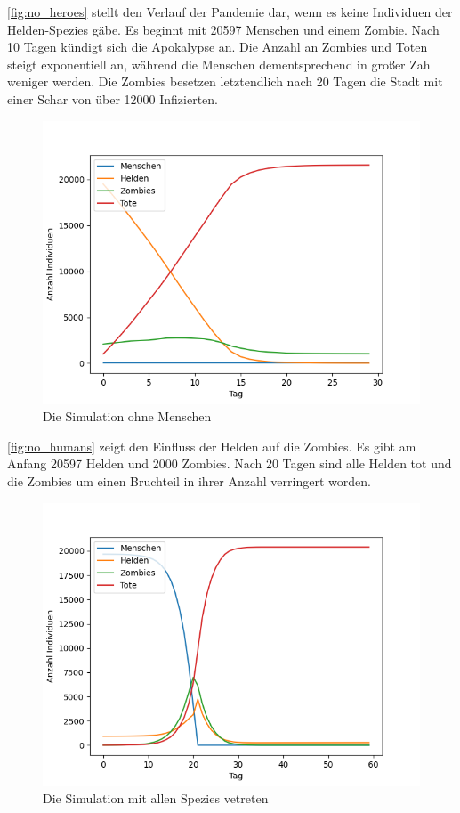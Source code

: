     \autoref{fig:no_heroes} stellt den Verlauf der Pandemie dar, wenn es keine Individuen der Helden-Spezies gäbe. Es beginnt mit 20597 Menschen und einem Zombie. Nach 10 Tagen kündigt sich die Apokalypse an. Die Anzahl an Zombies und Toten steigt exponentiell an, während die Menschen dementsprechend in großer Zahl weniger werden. Die Zombies besetzen letztendlich nach 20 Tagen die Stadt mit einer Schar von über 12000 Infizierten.
    \newpage
    \begin{figure}[h]
        \centering
        \includegraphics[width=1\textwidth]{zombified_all_heroes.png}
        \caption{Die Simulation ohne Menschen}
        \label{fig:no_humans}
    \end{figure}
    \autoref{fig:no_humans} zeigt den Einfluss der Helden auf die Zombies. Es gibt am Anfang 20597 Helden und 2000 Zombies. Nach 20 Tagen sind alle Helden tot und die Zombies um einen Bruchteil in ihrer Anzahl verringert worden.
    \newpage
    \begin{figure}[h]
        \centering
        \includegraphics[width=1\textwidth]{zombified.png}
        \caption{Die Simulation mit allen Spezies vetreten}
        \label{fig:simulation}
    \end{figure}
